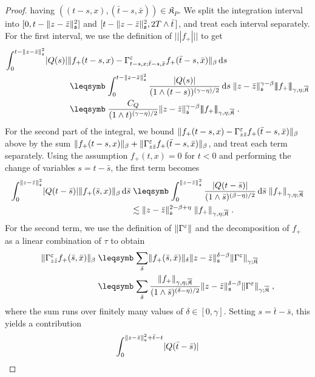 \documentclass[reqno,11pt]{article}
\def\normDgamma#1{|\!|\!|#1|\!|\!|}
\def\fraks{\mathfrak{s}}
\def\fraK{\mathfrak{K}}
\def\fraKbar{\overline{\mathfrak{K}}}
\begin{document}
\begin{proof}
having $((t-s,x),(\bar t-s,\bar x))\in\fraK_P$. We split the integration
interval into $[0,t-\norm{z-\bar z}^2_\fraks]$ and $[t-\norm{z-\bar
z}^2_\fraks,2T\wedge\bar t\,]$, and treat each interval separately. For the
first interval, we use the definition of $\normDgamma{f_+}$ to get 
\begin{align*}
\int_0^{t-\norm{z-\bar z}^2_\fraks} \abs{Q(s)} &\norm{f_+(t-s,x)
-\Gamma^\eps_{t-s,x;\bar t-s,\bar x}f_+(\bar t-s,\bar x)}_\beta \6s \\
&\leqs \int_0^{t-\norm{z-\bar z}^2_\fraks}
\frac{\abs{Q(s)}}{(1\wedge(t-s))^{(\gamma-\eta)/2}}\6s \; \norm{z-\bar
z}^{\gamma-\beta}_\fraks \normDgamma{f_+}_{\gamma,\eta;\fraKbar} \\
&\leqs \frac{C_Q}{(1\wedge t)^{(\gamma-\eta)/2}} \norm{z-\bar
z}^{\gamma-\beta}_\fraks \normDgamma{f_+}_{\gamma,\eta;\fraKbar}\;.
\end{align*}
For the second part of the integral, we bound $\lVert f_+(t-s,x)
-\Gamma^\varepsilon_{z\bar z}f_+(\bar t-s,\bar x)\rVert_\beta$ above by the sum
$\lVert f_+(t-s,x)\rVert_\beta + \lVert\Gamma^\varepsilon_{z\bar z}f_+(\bar t-s,\bar
x)\rVert_\beta$, and treat each term separately. Using the assumption
$f_+(t,x)=0$ for $t<0$ and performing the change of variables $s=t-\bar s$, 
the first term becomes 
\begin{align*}
\int_0^{\norm{z-\bar z}_\fraks^2} \abs{Q(t-\bar s)} \norm{f_+(\bar s,x)}_\beta
\6\bar s 
&\leqs \int_0^{\norm{z-\bar z}_\fraks^2} \frac{\abs{Q(t-\bar s)}}
{(1\wedge\bar s)^{(\beta-\eta)/2}} \6\bar s
\;\norm{f_+}_{\gamma,\eta;\fraKbar}\\
&\lesssim \norm{z-\bar z}_\fraks^{2-\beta+\eta}
\;\norm{f_+}_{\gamma,\eta;\fraKbar}\;.
\end{align*}
For the second term, we use the definition of $\lVert\Gamma^\varepsilon\rVert$ and the
decomposition of $f_+$ as a linear combination of $\tau$ to obtain  
\begin{align*}
\norm{\Gamma^\eps_{z\bar z}f_+(\bar s,\bar x)}_\beta 
&\leqs \sum_\delta \norm{f_+(\bar s,\bar x)}_\delta \norm{z-\bar
z}_\fraks^{\delta-\beta} \norm{\Gamma^\eps}_{\gamma;\fraKbar} \\
&\leqs \sum_\delta \frac{\norm{f_+}_{\gamma,\eta;\fraKbar}}
{(1\wedge\bar s)^{(\delta-\eta)/2} } \norm{z-\bar
z}_\fraks^{\delta-\beta} \norm{\Gamma^\eps}_{\gamma;\fraKbar}\;,
\end{align*}
where the sum runs over finitely many values of $\delta\in[0,\gamma]$. 
Setting $s=\bar t-\bar s$, this yields a contribution 
\begin{align*}
\int_0^{\norm{z-\bar z}_\fraks^2+\bar t-t} \abs{Q(\bar t-\bar s)} 

\end{align*}
\end{proof}
\end{document}
